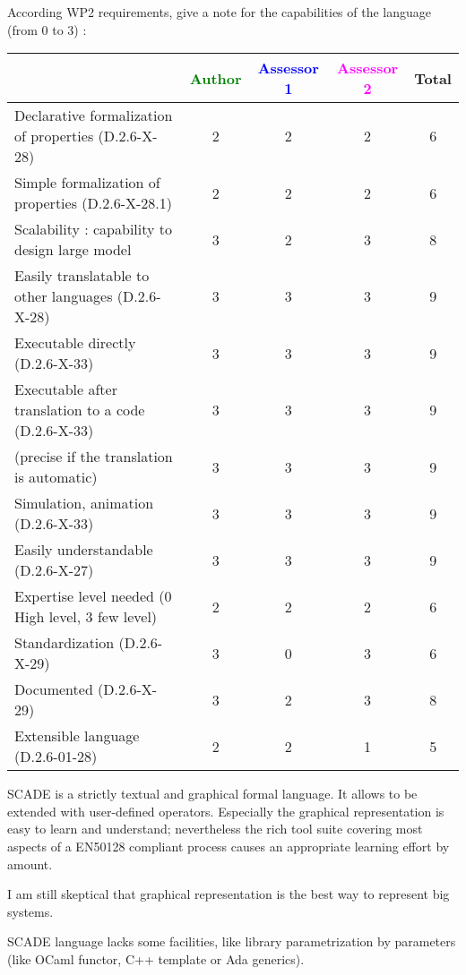 According WP2 requirements, give a note for the capabilities of the language (from 0 to 3) :

\begin{tabular}{|l | c | c | c | c|}
\hline
& \textcolor{green}{Author} & \textcolor{blue}{Assessor 1} & \textcolor{magenta}{Assessor 2} & Total \\
\hline
Declarative formalization of properties (D.2.6-X-28) &
2  & 2 &2 & 6 \\
\hline
Simple formalization of properties (D.2.6-X-28.1) &
2 & 2 &2 & 6 \\
\hline
Scalability : capability to design large model &  3
& 2 &3 & 8 \\
\hline
Easily translatable to other languages (D.2.6-X-28) &
3  & 3 &3 & 9 \\
\hline
Executable directly (D.2.6-X-33) & 3  & 3 &3 & 9 \\
\hline
Executable after translation to a code (D.2.6-X-33) &
3& 3 &3 & 9 \\
(precise if the translation is automatic) &  3& 3 &3 & 9 \\
\hline
Simulation, animation (D.2.6-X-33) &  3 & 3 &3 & 9 \\
\hline
Easily understandable (D.2.6-X-27) &  3& 3 &3 & 9 \\
\hline
Expertise level needed (0 High level, 3 few level) &
2 & 2 &2 & 6 \\
\hline
Standardization (D.2.6-X-29) &  3& 0 &3 & 6 \\
\hline
Documented (D.2.6-X-29) &  3 & 2 &3 & 8 \\
\hline
Extensible language (D.2.6-01-28) &  2& 2 &1 & 5 \\
\hline
\end{tabular}
\begin{author_comment}
SCADE is a strictly textual and graphical formal language. It allows to be extended with user-defined operators. Especially the graphical representation is easy to learn and understand; nevertheless the rich tool suite covering most aspects of a EN50128 compliant process causes an appropriate learning effort by amount.
\end{author_comment}


\begin{assessor1}
  I am still skeptical that graphical representation is the best way
  to represent big systems.

  SCADE language lacks some facilities, like library parametrization
  by parameters (like OCaml functor, C++ template or Ada generics).
\end{assessor1}

